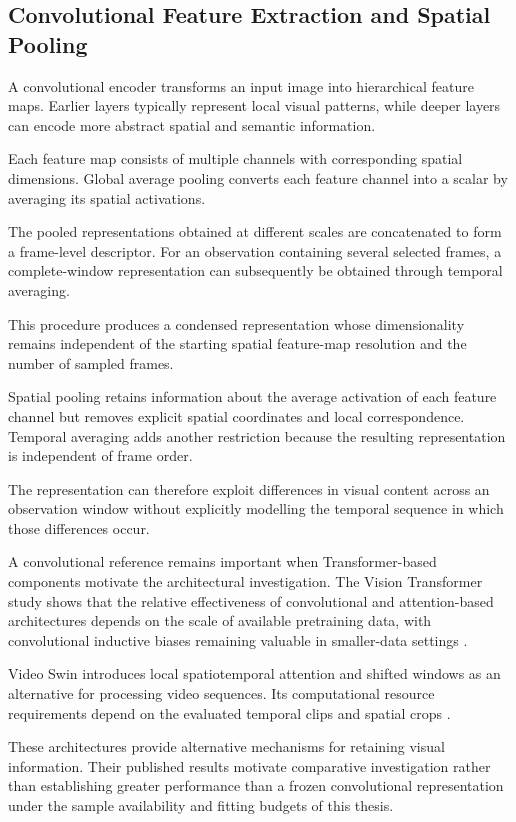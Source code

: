 \subsection{Convolutional Feature Extraction and Spatial Pooling}

A convolutional encoder transforms an input image into hierarchical feature maps. Earlier layers typically represent local visual patterns, while deeper layers can encode more abstract spatial and semantic information.

Each feature map consists of multiple channels with corresponding spatial dimensions. Global average pooling converts each feature channel into a scalar by averaging its spatial activations.

The pooled representations obtained at different scales are concatenated to form a frame-level descriptor. For an observation containing several selected frames, a complete-window representation can subsequently be obtained through temporal averaging.

This procedure produces a condensed representation whose dimensionality remains independent of the starting spatial feature-map resolution and the number of sampled frames.

Spatial pooling retains information about the average activation of each feature channel but removes explicit spatial coordinates and local correspondence. Temporal averaging adds another restriction because the resulting representation is independent of frame order.

The representation can therefore exploit differences in visual content across an observation window without explicitly modelling the temporal sequence in which those differences occur.

A convolutional reference remains important when Transformer-based components motivate the architectural investigation. The Vision Transformer study shows that the relative effectiveness of convolutional and attention-based architectures depends on the scale of available pretraining data, with convolutional inductive biases remaining valuable in smaller-data settings \parencite{P010}.

Video Swin introduces local spatiotemporal attention and shifted windows as an alternative for processing video sequences. Its computational resource requirements depend on the evaluated temporal clips and spatial crops \parencite{P013}.

These architectures provide alternative mechanisms for retaining visual information. Their published results motivate comparative investigation rather than establishing greater performance than a frozen convolutional representation under the sample availability and fitting budgets of this thesis.

